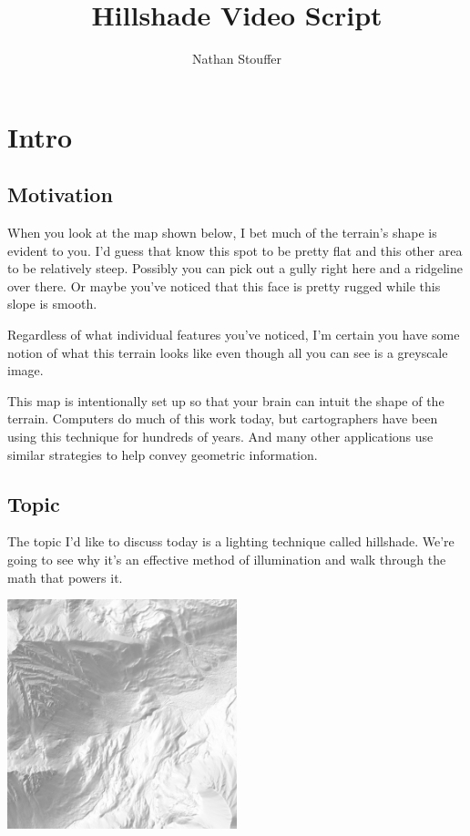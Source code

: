 \documentclass{article}
\begin{document}
	
\title{Hillshade Video Script}
\author{Nathan Stouffer}
\date{}
\maketitle

\section{Intro}

\subsection{Motivation}

When you look at the map shown below, I bet much of the terrain's shape is evident to you.
I'd guess that know this spot to be pretty flat and this other area to be relatively steep.
Possibly you can pick out a gully right here and a ridgeline over there.
Or maybe you've noticed that this face is pretty rugged while this slope is smooth.

Regardless of what individual features you've noticed, I'm certain you have some notion of what this terrain looks like even though all you can see is a greyscale image.

This map is intentionally set up so that your brain can intuit the shape of the terrain.
Computers do much of this work today, but cartographers have been using this technique for hundreds of years.
And many other applications use similar strategies to help convey geometric information.

\subsection{Topic}

The topic I'd like to discuss today is a lighting technique called hillshade.
We're going to see why it's an effective method of illumination and walk through the math that powers it.

\begin{center}
	\includegraphics[width=0.5\textwidth,frame]{assets/hillshade-example.png}
\end{center}
\end{document}
